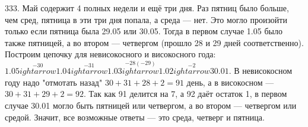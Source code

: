 333. Май содержит 4 полных недели и ещё три дня. Раз пятниц было больше, чем сред, пятница в эти три дня попала, а среда --- нет. Это могло произойти только если пятница была 29.05 или 30.05. Тогда в первом случае 1.05 было также пятницей, а во втором --- четвергом (прошло 28 и 29 дней соответственно). Построим цепочку для невисокосного и високосного года: $1.05\stackrel{-30}{
ightarrow}1.04\stackrel{-31}{
ightarrow}1.03
\stackrel{-28(-29)}{
ightarrow}1.02\stackrel{-2}{
ightarrow}30.01.$
В невисокосном году надо "отмотать назад" $30+31+28+2=91$ день, а в високосном --- $30+31+29+2=92.$ Так как 91 делится на 7, а 92 даёт остаток 1, в первом случае 30.01 могло быть пятницей или четвергом, а во втором --- четвергом или средой. Значит, все возможные ответы --- это среда, четверг и пятница.\\
